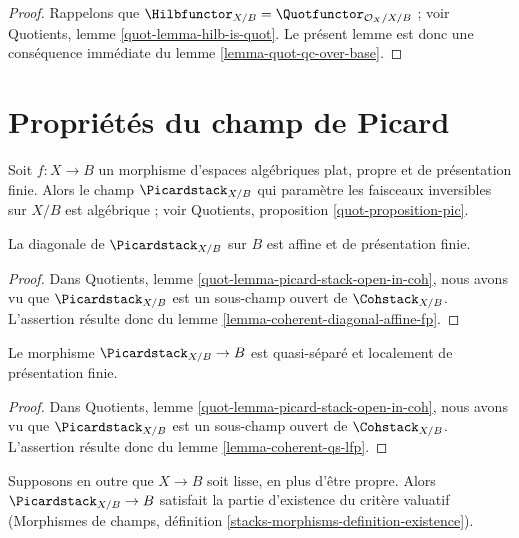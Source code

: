 \begin{proof}
Rappelons que
$\Hilbfunctor_{X/B} = \Quotfunctor_{\mathcal{O}_X/X/B}$ ; voir Quotients,
lemme \ref{quot-lemma-hilb-is-quot}.
Le présent lemme est donc une conséquence immédiate du lemme
\ref{lemma-quot-qc-over-base}.
\end{proof}








\section{Propriétés du champ de Picard}
\label{section-picard-stack}

\noindent
Soit $f : X \to B$ un morphisme d'espaces algébriques plat, propre et de
présentation finie. Alors le champ $\Picardstack_{X/B}$ qui paramètre les
faisceaux inversibles sur $X/B$ est algébrique ; voir Quotients,
proposition \ref{quot-proposition-pic}.

\begin{lemma}
\label{lemma-pic-diagonal-affine-fp}
La diagonale de $\Picardstack_{X/B}$ sur $B$ est affine et de présentation
finie.
\end{lemma}

\begin{proof}
Dans Quotients, lemme \ref{quot-lemma-picard-stack-open-in-coh}, nous avons
vu que $\Picardstack_{X/B}$ est un sous-champ ouvert de
$\Cohstack_{X/B}$. L'assertion résulte donc du lemme
\ref{lemma-coherent-diagonal-affine-fp}.
\end{proof}

\begin{lemma}
\label{lemma-pic-qs-lfp}
Le morphisme $\Picardstack_{X/B} \to B$ est quasi-séparé et localement de
présentation finie.
\end{lemma}

\begin{proof}
Dans Quotients, lemme \ref{quot-lemma-picard-stack-open-in-coh}, nous avons
vu que $\Picardstack_{X/B}$ est un sous-champ ouvert de
$\Cohstack_{X/B}$. L'assertion résulte donc du lemme
\ref{lemma-coherent-qs-lfp}.
\end{proof}

\begin{lemma}
\label{lemma-pic-existence-part}
Supposons en outre que $X \to B$ soit lisse, en plus d'être propre.
Alors $\Picardstack_{X/B} \to B$ satisfait la partie d'existence du critère
valuatif (Morphismes de champs, définition
\ref{stacks-morphisms-definition-existence}).
\end{lemma}

